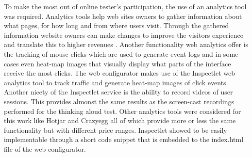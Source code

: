 \documentclass[../medieninformatik-arbeit.tex]{subfiles}
\begin{document}
To make the most out of online tester's participation, the use of an analytics tool was required. Analytics tools help web sites owners to gather information about what pages, for how long and from where users visit. Through the gathered information website owners can make changes to improve the visitors experience and translate this to higher revenues \cite{peterson2004web}. Another functionality web analytics offer is the tracking of mouse clicks which are used to generate event logs and in some cases even heat-map images that visually display what parts of the interface receive the most clicks. The web configurator makes use of the Inspectlet web analytics tool \cite{inspectlet} to track traffic and generate heat-map images of click events. Another nicety of the Inspectlet service is the ability to record videos of user sessions. This provides almonst the same results as the screen-cast recordings performed for the thinking aloud test. Other analytics tools were considered for this work like Hotjar \cite{hotjar} and Crazyegg \cite{inspectlet} all of which provide more or less the same functionality but with different price ranges. Inspectlet showed to be easily implementable through a short code snippet that is embedded to the index.html file of the web configurator. 
\end{document}
